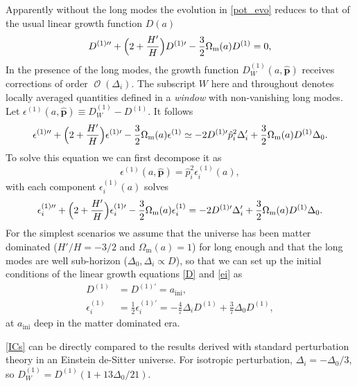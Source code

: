 \documentclass[a4paper,11pt]{article}
\DeclareMathOperator{\order}{\mathcal{O}}
\newcommand{\vp}{{\bm p}}
\begin{document}
Apparently without the long modes the evolution in \eqref{pot_evo} reduces to
that of the usual linear growth function $D(a)$
\begin{equation}
    D^{(1)\prime\prime} + \Bigl( 2 + \frac{H'} H \Bigr) D^{(1)\prime}
    - \frac32 \Omega_\mathrm{m}(a) D^{(1)} = 0,
    \label{D}
\end{equation}
In the presence of the long modes, the growth function $D^{(1)}_W(a, \hat\vp)$
receives corrections of order $\order(\Delta_i)$.
The subscript $W$ here and throughout denotes locally averaged quantities
defined in a \emph{window} with non-vanishing long modes.
Let $\epsilon^{(1)}(a, \hat\vp) \equiv D^{(1)}_W - D^{(1)}$. It follows
\begin{equation}
    \epsilon^{(1)\prime\prime} + \Bigl( 2 + \frac{H'} H \Bigr) \epsilon^{(1)\prime}
    - \frac32 \Omega_\mathrm{m}(a) \epsilon^{(1)}
    \simeq
    - 2 D^{(1)\prime} \hat p_i^2 \Delta_i' + \frac32 \Omega_\mathrm{m}(a) D^{(1)} \Delta_0.
\end{equation}
To solve this equation we can first decompose it as
\begin{equation}
    \epsilon^{(1)}(a, \hat\vp) = \hat p_i^2 \epsilon^{(1)}_i(a),
    \label{e}
\end{equation}
with each component $\epsilon^{(1)}_i(a)$ solves
\begin{equation}
    \epsilon_i^{(1)\prime\prime} + \Bigl( 2 + \frac{H'} H \Bigr) \epsilon_i^{(1)\prime}
    - \frac32 \Omega_\mathrm{m}(a) \epsilon_i^{(1)}
    = - 2 D^{(1)\prime} \Delta_i' + \frac32 \Omega_\mathrm{m}(a) D^{(1)} \Delta_0.
    \label{ei}
\end{equation}
For the simplest scenarios we assume that the universe has been matter
dominated ($H'/H = -3/2$ and $\Omega_\mathrm{m}(a) = 1$) for long enough and
that the long modes are well sub-horizon ($\Delta_0, \Delta_i \propto D$), so
that we can set up the initial conditions of the linear growth equations
\eqref{D} and \eqref{ei} as
\begin{align}
    D^{(1)} &= D^{(1)\prime} = a_\mathrm{ini}, \nonumber\\
    \epsilon^{(1)}_i &= \frac12 \epsilon^{(1)\prime}_i
    = -\frac47 \Delta_i D^{(1)} + \frac37 \Delta_0 D^{(1)},
    \label{ICs}
\end{align}
at $a_\mathrm{ini}$ deep in the matter dominated era.

\eqref{ICs} can be directly compared to the results derived with standard
perturbation theory in an Einstein de-Sitter universe.
For isotropic perturbation, $\Delta_i = - \Delta_0 / 3$, so $D^{(1)}_W = D^{(1)} (1 + 13
\Delta_0 / 21)$.
\end{document}
